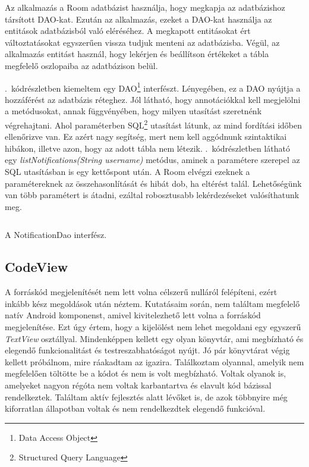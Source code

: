 \documentclass{thesis-ekf}
\theoremstyle{definition}
\theoremstyle{remark}
\begin{document}
Az alkalmazás a Room adatbázist használja, hogy megkapja az adatbázishoz társított DAO-kat.
Ezután az alkalmazás, ezeket a DAO-kat használja az entitások adatbázisból való eléréséhez.
A megkapott entitásokat ért változtatásokat egyszerűen vissza tudjuk menteni az adatbázisba.
Végül, az alkalmazás entitást használ, hogy lekérjen és beállítson értékeket a tábla megfelelő oszlopaiba az adatbázison belül.\cite{room}

.~kódrészletben kiemeltem egy DAO\footnote{Data Access Object} interfészt.
Lényegében, ez a DAO nyújtja a hozzáférést az adatbázis réteghez.
Jól látható, hogy annotációkkal kell megjelölni a metódusokat, annak függvényében, hogy milyen utasítást szeretnénk végrehajtani.
Ahol paraméterben SQL\footnote{Structured Query Language} utasítást látunk, az mind fordítási időben ellenőrizve van.
Ez azért nagy segítség, mert nem kell aggódnunk szintaktikai hibákon, illetve azon, hogy az adott tábla nem létezik.
.~kódrészletben látható egy \emph{listNotifications(String username)} metódus, aminek a paramétere szerepel az SQL utasításban is egy kettőspont után.
A Room elvégzi ezeknek a paramétereknek az összehasonlítását és hibát dob, ha eltérést talál.
Lehetőségünk van több paramétert is átadni, ezáltal robosztusabb lekérdezéseket valósíthatunk meg.

\begin{listing}[ht]
	\inputminted[linenos=true]{java}{./codes/NotificationDao.java}
	\caption{A NotificationDao interfész.}
	\label{room}
\end{listing}

\subsection{CodeView}\label{code_view}

A forráskód megjelenítését nem lett volna célszerű nulláról felépíteni, ezért inkább kész megoldások után néztem.
Kutatásaim során, nem találtam megfelelő natív Android komponenst, amivel kivitelezhető lett volna a forráskód megjelenítése.
Ezt úgy értem, hogy a kijelölést nem lehet megoldani egy egyszerű \emph{TextView} osztállyal.
Mindenképpen kellett egy olyan könyvtár, ami megbízható és elegendő funkcionalitást és testreszabhatóságot nyújt.
Jó pár könyvtárat végig kellett próbálnom, mire ráakadtam az igazira.
Találkoztam olyannal, amelyik nem megfelelően töltötte be a kódot és nem is volt megbízható.
Voltak olyanok is, amelyeket nagyon régóta nem voltak karbantartva és elavult kód bázissal rendelkeztek.
Találtam aktív fejlesztés alatt lévőket is, de azok többnyire még kiforratlan állapotban voltak és nem rendelkezdtek elegendő funkcióval.
\end{document}
